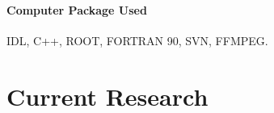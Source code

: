 \documentclass[12pt, letterpaper]{article}
\begin{document}
\paragraph{Computer Package Used} IDL, C++, ROOT, FORTRAN 90, SVN, FFMPEG.




\section*{Current Research}


% 



\end{document}
